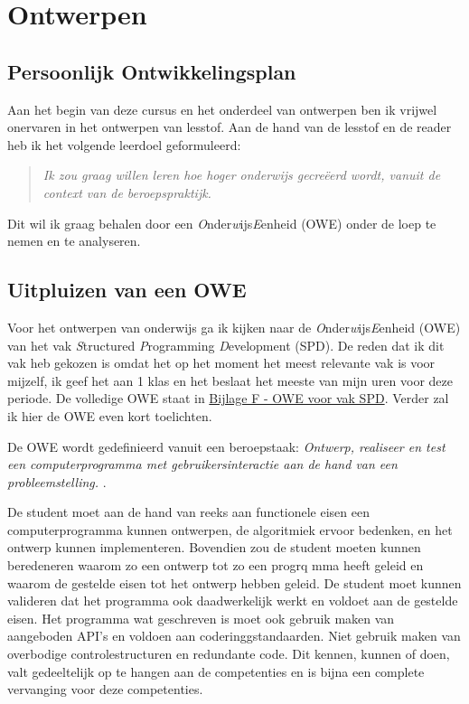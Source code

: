 \section{Ontwerpen}

\subsection{Persoonlijk Ontwikkelingsplan}
Aan het begin van deze cursus en het onderdeel van ontwerpen ben ik vrijwel onervaren in het ontwerpen van lesstof. Aan de hand van de lesstof en de reader heb ik het volgende leerdoel geformuleerd:
\begin{quote}
  \textit{Ik zou graag willen leren hoe hoger onderwijs gecreëerd wordt, vanuit de context van de beroepspraktijk.}
\end{quote}
Dit wil ik graag behalen door een \textit{O}nder\textit{w}ijs\textit{E}enheid (OWE) onder de loep te nemen en te analyseren.

\subsection{Uitpluizen van een OWE}
Voor het ontwerpen van onderwijs ga ik kijken naar de \textit{O}nder\textit{w}ijs\textit{E}enheid (OWE) van het vak \textit{S}tructured \textit{P}rogramming \textit{D}evelopment (SPD). De reden dat ik dit vak heb gekozen is omdat het op het moment het meest relevante vak is voor mijzelf, ik geef het aan 1 klas en het beslaat het meeste van mijn uren voor deze periode. De volledige OWE staat in \hyperref[sec:owespd]{Bijlage F - OWE voor vak SPD}. Verder zal ik hier de OWE even kort toelichten.

De OWE wordt gedefinieerd vanuit een beroepstaak: \textit{Ontwerp, realiseer en test een computerprogramma met gebruikersinteractie aan de hand van een probleemstelling.
}.

De student moet aan de hand van reeks aan functionele eisen een computerprogramma kunnen ontwerpen, de algoritmiek ervoor bedenken, en het ontwerp kunnen implementeren. Bovendien zou de student moeten kunnen beredeneren waarom zo een ontwerp tot zo een progrq
mma heeft geleid en waarom de gestelde eisen tot het ontwerp hebben geleid. De student moet kunnen valideren dat het programma ook daadwerkelijk werkt en voldoet aan de gestelde eisen. Het programma wat geschreven is moet ook gebruik maken van aangeboden API's  en voldoen aan coderinggstandaarden. Niet gebruik maken van overbodige controlestructuren en redundante code. 
Dit kennen, kunnen of doen, valt gedeeltelijk op te hangen aan de competenties en is bijna een complete vervanging voor deze competenties. 


